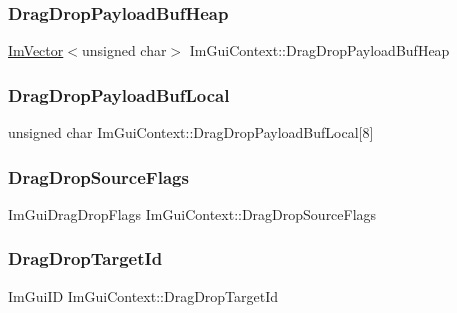 \subsubsection{\texorpdfstring{Drag\+Drop\+Payload\+Buf\+Heap}{DragDropPayloadBufHeap}}
{\footnotesize\ttfamily \hyperlink{class_im_vector}{Im\+Vector}$<$unsigned char$>$ Im\+Gui\+Context\+::\+Drag\+Drop\+Payload\+Buf\+Heap}

\hypertarget{struct_im_gui_context_ae4f0ffccf3107a3eb4e1ba3d6258c3e4}{}\label{struct_im_gui_context_ae4f0ffccf3107a3eb4e1ba3d6258c3e4} 
\subsubsection{\texorpdfstring{Drag\+Drop\+Payload\+Buf\+Local}{DragDropPayloadBufLocal}}
{\footnotesize\ttfamily unsigned char Im\+Gui\+Context\+::\+Drag\+Drop\+Payload\+Buf\+Local\mbox{[}8\mbox{]}}

\hypertarget{struct_im_gui_context_a61d6d8dbd670e2f4e70d50248caac012}{}\label{struct_im_gui_context_a61d6d8dbd670e2f4e70d50248caac012} 
\subsubsection{\texorpdfstring{Drag\+Drop\+Source\+Flags}{DragDropSourceFlags}}
{\footnotesize\ttfamily Im\+Gui\+Drag\+Drop\+Flags Im\+Gui\+Context\+::\+Drag\+Drop\+Source\+Flags}

\hypertarget{struct_im_gui_context_af8641ca16b62736c6af16364e65666ab}{}\label{struct_im_gui_context_af8641ca16b62736c6af16364e65666ab} 
\subsubsection{\texorpdfstring{Drag\+Drop\+Target\+Id}{DragDropTargetId}}
{\footnotesize\ttfamily Im\+Gui\+ID Im\+Gui\+Context\+::\+Drag\+Drop\+Target\+Id}

\hypertarget{struct_im_gui_context_a9c0b11750492d186c9b96b75d824e91b}{}\label{struct_im_gui_context_a9c0b11750492d186c9b96b75d824e91b} 
